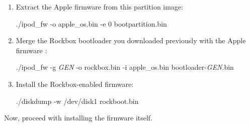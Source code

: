 \begin{enumerate}
{      for use if you ever wish to either upgrade the Rockbox bootloader or
      uninstall Rockbox from your iPod
    }
  \item Extract the Apple firmware from this partition image:
    \begin{code}
    ./ipod_fw -o apple_os.bin -e 0 bootpartition.bin
    \end{code}
  \item Merge the Rockbox bootloader you downloaded previously with the Apple
    firmware :
    \begin{code}
    ./ipod_fw -g \emph{GEN} -o rockbox.bin -i apple_os.bin bootloader-\emph{GEN}.bin
    \end{code}
  \item
    Install the Rockbox-enabled firmware:
    \begin{code}
    ./diskdump -w /dev/disk1 rockboot.bin
    \end{code}
\end{enumerate}

Now, proceed with installing the firmware itself.

